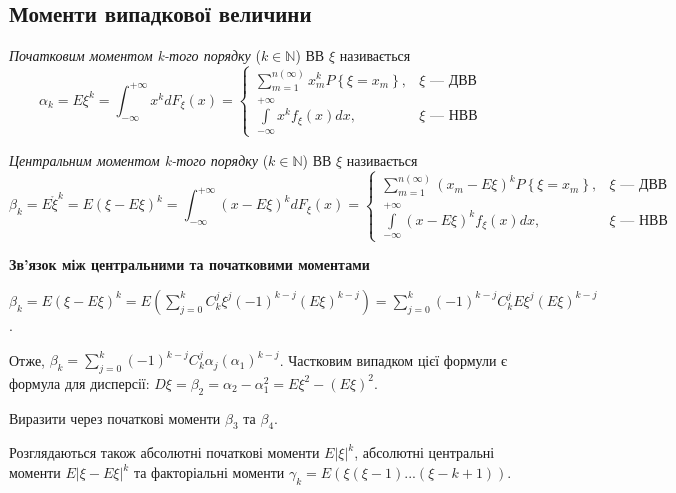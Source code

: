 \subsection{Моменти випадкової величини}
\begin{definition}
    \emph{Початковим моментом k-того порядку} ($k \in \mathbb{N}$) ВВ $\xi$ називається
    \begin{equation}\label{eq:e_alpha_k}
        \alpha_k = E\xi^k = \int_{-\infty}^{+\infty} x^k dF_\xi(x) = \begin{cases}
            \sum\limits_{m=1}^{n(\infty)} x_m^k P\left\{\xi = x_m\right\}, & \xi \text{ --- ДВВ} \\
            \int\limits_{-\infty}^{+\infty} x^k f_\xi(x)dx, & \xi \text{ --- НВВ}
        \end{cases}
    \end{equation}
\end{definition}
\begin{definition}
    \emph{Центральним моментом k-того порядку} ($k \in \mathbb{N}$) ВВ $\xi$ називається
    \begin{equation}\label{eq:d_beta_k}
        \beta_k = E\mathring{\xi}^k = E\left(\xi-E\xi\right)^k = \int_{-\infty}^{+\infty} \left(x-E\xi\right)^k dF_\xi(x) = \begin{cases}
            \sum\limits_{m=1}^{n(\infty)} \left(x_m-E\xi\right)^k P\left\{\xi = x_m\right\}, & \xi \text{ --- ДВВ} \\
            \int\limits_{-\infty}^{+\infty} \left(x-E\xi\right)^k f_\xi(x)dx, & \xi \text{ --- НВВ}
        \end{cases}
    \end{equation}
\end{definition}

\noindent \textbf{Зв'язок між центральними та початковими моментами}

$\beta_k = E\left(\xi-E\xi\right)^k = E\left( \sum\limits_{j=0}^k C_k^j \xi^j (-1)^{k-j} (E\xi)^{k-j}\right) =
\sum\limits_{j=0}^k (-1)^{k-j} C_k^j E\xi^j (E\xi)^{k-j}$.

\noindent Отже, $\beta_k = \sum\limits_{j=0}^k (-1)^{k-j} C_k^j \alpha_j (\alpha_1)^{k-j}$.
Частковим випадком цієї формули є формула для дисперсії: $D\xi = \beta_2 = \alpha_2 - \alpha_1^2 = E\xi^2 - (E\xi)^2$.
\begin{exercise}
    Виразити через початкові моменти $\beta_3$ та $\beta_4$.
\end{exercise}
Розглядаються також абсолютні початкові моменти $E\vert \xi \vert ^k$, абсолютні центральні моменти $E\vert \xi - E\xi \vert ^k$
та факторіальні моменти $\gamma_k = E\left( \xi (\xi - 1) ... (\xi - k + 1)\right)$.



